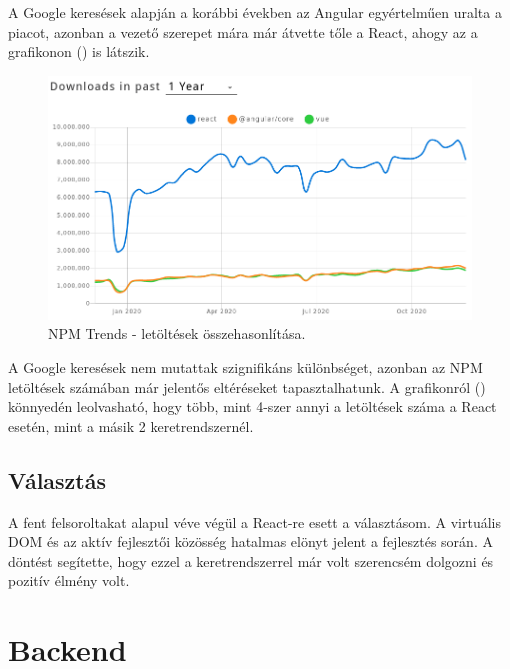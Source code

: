 A Google keresések alapján a korábbi években az Angular egyértelműen uralta a piacot, azonban a vezető szerepet mára már átvette tőle a React, ahogy az a grafikonon () is látszik.

\begin{figure}[!ht]
  \centering
  \includegraphics[width=150mm, keepaspectratio]{figures/npm_trends.png}
  \caption{NPM Trends - letöltések összehasonlítása.}
  \label{fig:NPMTrends}
\end{figure}

A Google keresések nem mutattak szignifikáns különbséget, azonban az NPM letöltések számában már jelentős eltéréseket tapasztalhatunk. A grafikonról () könnyedén leolvasható, hogy több, mint 4-szer annyi a letöltések száma a React esetén, mint a másik 2 keretrendszernél.

\subsection{Választás}
A fent felsoroltakat alapul véve végül a React-re esett a választásom. A virtuális DOM és az aktív fejlesztői közösség hatalmas elönyt jelent a fejlesztés során. A döntést segítette, hogy ezzel a keretrendszerrel már volt szerencsém dolgozni és pozitív élmény volt.

\section{Backend}

